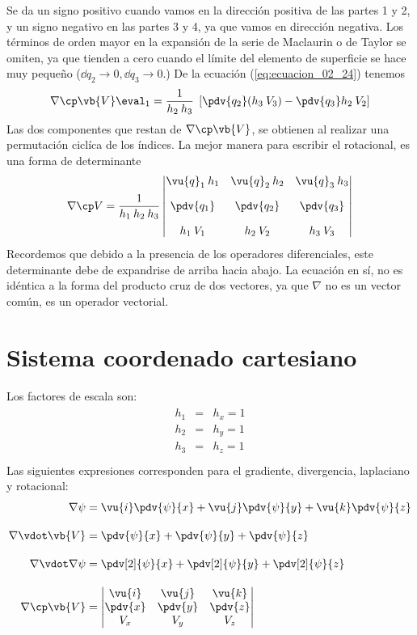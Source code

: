 Se da un signo positivo cuando vamos en la dirección positiva de las partes 1 y 2, y un signo negativo en las partes 3 y 4, ya que vamos en dirección negativa. Los términos de orden mayor en la expansión de la serie de Maclaurin o de Taylor se omiten, ya que tienden a cero cuando el límite del elemento de superficie se hace muy pequeño ($\dd{q_{2}} \rightarrow 0, \dd{q_{3}} \rightarrow 0$.)
De la ecuación (\ref{eq:ecuacion_02_24}) tenemos
\begin{equation}
\nabla \cp \vb{V} \eval_{1} = \dfrac{1}{h_{2} \:h_{3}} \; \left[ \pdv{q_{2}} (h_{3} \: V_{3}) - \pdv{q_{3}} h_{2} \: V_{2} \right]
\label{eq:ecuacion_02_26}
\end{equation}
Las dos componentes que restan de $\nabla \cp \vb{V}$, se obtienen al realizar una permutación ciclíca de los índices. La mejor manera para escribir el rotacional, es una forma de determinante
\begin{equation}
\nabla \cp V = \dfrac{1}{h_{1} \: h_{2} \: h_{3}} \begin{vmatrix}
\vu{q}_{1} \: h_{1} & \vu{q}_{2} \: h_{2} & \vu{q}_{3} \: h_{3} \\[1em]
\displaystyle \pdv{q_{1}} & \displaystyle \pdv{q_{2}} & \displaystyle \pdv{q_{3}} \\[1em]
h_{1} \: V_{1} & h_{2} \: V_{2} & h_{3} \: V_{3}
\end{vmatrix}
\end{equation}
Recordemos que debido a la presencia de los operadores diferenciales, este determinante debe de expandrise de arriba hacia abajo. La ecuación en sí, no es idéntica a la forma del producto cruz de dos vectores, ya que $\nabla$ no es un vector común, es un operador vectorial.
\section{Sistema coordenado cartesiano}
Los factores de escala son:
\begin{align*}
\begin{aligned}
h_{1} &=& h_{x} = 1 \\
h_{2} &=& h_{y} = 1 \\
h_{3} &=& h_{z} = 1 \\
\end{aligned}
\end{align*}
Las siguientes expresiones corresponden para el gradiente, divergencia, laplaciano y rotacional:
\begin{align*}
\nabla \psi &= \vu{i} \pdv{\psi}{x} + \vu{j} \pdv{\psi}{y} + \vu{k} \pdv{\psi}{z} \\[1em]
\nabla \vdot \vb{V} &= \pdv{\psi}{x} + \pdv{\psi}{y} + \pdv{\psi}{z} \\[1em]
\nabla \vdot \nabla \psi &= \pdv[2]{\psi}{x} + \pdv[2]{\psi}{y} +  \pdv[2]{\psi}{z} \\[1em]
\nabla \cp \vb{V} &= \begin{vmatrix}
\vu{i} & \vu{j} & \vu{k} \\
\displaystyle \pdv{x} & \displaystyle \pdv{y} & \displaystyle \pdv{z} \\
V_{x} & V_{y} & V_{z}
\end{vmatrix}
\end{align*}
